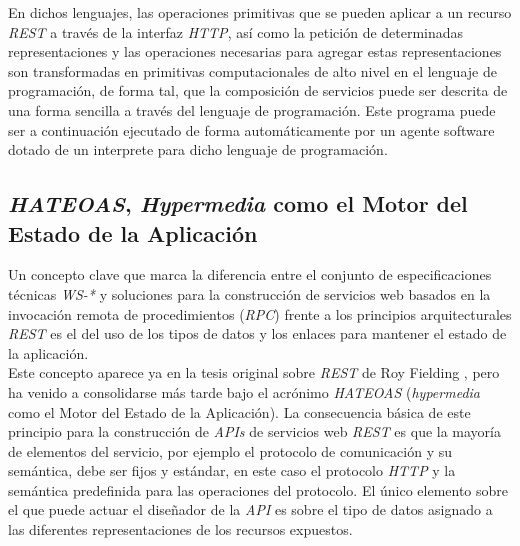 En dichos lenguajes, las operaciones primitivas que se pueden aplicar a un recurso \textit{REST} a trav\'es de la interfaz \textit{HTTP}, as\'i como la petici\'on de determinadas representaciones y las operaciones necesarias para agregar estas representaciones son transformadas en primitivas computacionales de alto nivel en el lenguaje de programaci\'on, de forma tal, que la composici\'on de servicios puede ser descrita de una forma sencilla a trav\'es del lenguaje de programaci\'on. Este programa puede ser a continuaci\'on ejecutado de forma autom\'aticamente por un agente software dotado de un interprete para dicho lenguaje de programaci\'on.\\

\subsection{\textit{HATEOAS}, \textit{Hypermedia} como el Motor del Estado de la Aplicaci\'on}

Un concepto clave que marca la diferencia entre el conjunto de especificaciones t\'ecnicas \textit{WS-*} y soluciones para la construcci\'on de servicios web basados en la invocaci\'on remota de procedimientos (\textit{RPC}) frente a los principios arquitecturales \textit{REST} es el del uso de los tipos de datos y los enlaces para mantener el estado de la aplicaci\'on.\\
Este concepto aparece ya en la tesis original sobre \textit{REST} de Roy Fielding \cite{fielding2000representational}, pero ha venido a consolidarse m\'as tarde bajo el acr\'onimo \textit{HATEOAS} (\textit{hypermedia} como el Motor del Estado de la Aplicaci\'on). La consecuencia b\'asica de este principio para la construcci\'on de \textit{APIs} de servicios web \textit{REST} es que la mayor\'ia de elementos del servicio, por ejemplo el protocolo de comunicaci\'on y su sem\'antica, debe ser fijos y est\'andar, en este caso el protocolo \textit{HTTP} y la sem\'antica predefinida para las operaciones del protocolo. El \'unico elemento sobre el que puede actuar el dise\~nador de la \textit{API} es sobre el tipo de datos asignado a las diferentes representaciones de los recursos expuestos.\\


